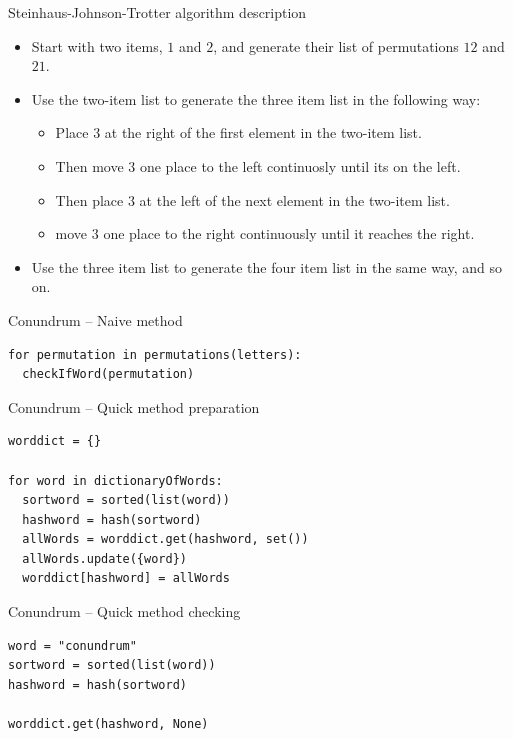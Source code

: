 \begin{frame}[fragile]{Steinhaus-Johnson-Trotter algorithm description}
  \begin{itemize}
    \item Start with two items, $1$ and $2$, and generate their list of permutations $12$ and $21$.
    \item Use the two-item list to generate the three item list in the following way:
    \begin{itemize}
      \item Place $3$ at the right of the first element in the two-item list.
      \item Then move $3$ one place to the left continuosly until its on the left.
      \item Then place $3$ at the left of the next element in the two-item list.
      \item move $3$ one place to the right continuously until it reaches the right.
    \end{itemize}
    \item Use the three item list to generate the four item list in the same way, and so on.
  \end{itemize}
\end{frame}

\begin{frame}[fragile]{Conundrum -- Naive method}
  \begin{verbatim}
for permutation in permutations(letters):
  checkIfWord(permutation)
  \end{verbatim}
\end{frame}

\begin{frame}[fragile]{Conundrum -- Quick method preparation}
  \begin{verbatim}
worddict = {}

for word in dictionaryOfWords:
  sortword = sorted(list(word))
  hashword = hash(sortword)
  allWords = worddict.get(hashword, set())
  allWords.update({word})
  worddict[hashword] = allWords
  \end{verbatim}
\end{frame}

\begin{frame}[fragile]{Conundrum -- Quick method checking}
  \begin{verbatim}
word = "conundrum"
sortword = sorted(list(word))
hashword = hash(sortword)

worddict.get(hashword, None)
  \end{verbatim}
\end{frame}


